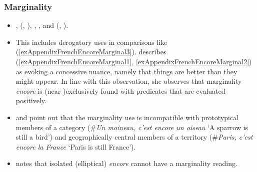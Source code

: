 \subsubsection{Marginality}\label{appendixFrenchEncoreMarginal}
\begin{itemize}
	\item \textcite{Deloor2012}, \citeauthor{MosegaardHansen2002} (\citeyear{MosegaardHansen2002}, \citeyear[175–181]{MosegaardHansen2008}), \textcite{Koenig1977}, \textcite{Muller1991}, \textcite{Nef1981} and \citeauthor{VictorriFuchs1992} (\citeyear{VictorriFuchs1992}, \citeyear{VictorriFuchs1996}).
	\item  This includes derogatory uses in comparisons like (\ref{exAppendixFrenchEncoreMarginal3}). \textcite[175]{MosegaardHansen2008} describes (\ref{exAppendixFrenchEncoreMarginal1}, \ref{exAppendixFrenchEncoreMarginal2}) as evoking a concessive nuance, namely that things are better than they might appear. In line with this observation, she observes that marginality \textit{encore} is (near-)exclusively found with predicates that are evaluated positively.
	\item \textcite[180]{MosegaardHansen2008} and \textcite{Muller1991} point out that the marginality use is incompatible with prototypical members of a category (\#\textit{Un moineau, c’est encore un oiseau} \lq A sparrow is still a bird') and geographically central members of a territory (\#\textit{Paris, c’est encore la France} \lq Paris is still France').
	\item \textcite[173]{MosegaardHansen2008} notes that isolated (elliptical) \textit{encore} cannot have a marginality reading.
\end{itemize}

